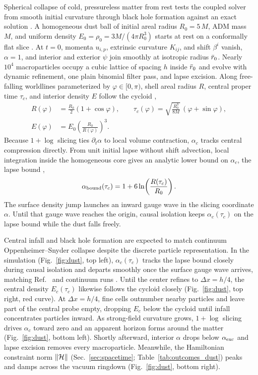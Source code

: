 Spherical collapse of cold, pressureless matter from rest tests the coupled solver from smooth initial curvature through black hole formation against an exact solution \cite{Oppenheimer:1939ue}. A homogeneous dust ball of initial areal radius $R_0 = 5\,M$, ADM mass $M$, and uniform density $E_0 = \rho_0 = 3M/(4\pi R_0^3)$ starts at rest on a conformally flat slice \cite{Petrich:1985jko,Staley:2011ss,Wu:2026nrpic}. At $t = 0$, momenta $u_{i,p}$, extrinsic curvature $K_{ij}$, and shift $\beta^i$ vanish, $\alpha = 1$, and interior and exterior $\psi$ join smoothly at isotropic radius $\bar{r}_0$. Nearly $10^4$ macroparticles occupy a cubic lattice of spacing $h$ inside $\bar{r}_0$ and evolve with dynamic refinement, one plain binomial filter pass, and lapse excision. Along free-falling worldlines parameterized by $\varphi \in [0, \pi)$, shell areal radius $R$, central proper time $\tau_c$, and interior density $E$ follow the cycloid \cite{Oppenheimer:1939ue},
\begin{align}\label{eq:cycloid}
R(\varphi) &= \frac{R_0}{2}(1 + \cos\varphi), \qquad
\tau_c(\varphi) = \sqrt{\frac{R_0^3}{8M}}\,(\varphi + \sin\varphi), \nonumber\\
E(\varphi) &= E_0\!\left(\frac{R_0}{R(\varphi)}\right)^3.
\end{align}
Because $1+\log$ slicing ties $\partial_t\alpha$ to local volume contraction, $\alpha_c$ tracks central compression directly. From unit initial lapse without shift advection, local integration inside the homogeneous core gives an analytic lower bound on $\alpha_c$, the lapse bound \cite{Staley:2011ss},
\begin{equation}\label{eq:lapse_bound}
\alpha_{\rm bound}(\tau_c) = 1 + 6\ln\!\left(\frac{R(\tau_c)}{R_0}\right).
\end{equation}
The surface density jump launches an inward gauge wave in the slicing coordinate $\alpha$. Until that gauge wave reaches the origin, causal isolation keeps $\alpha_c(\tau_c)$ on the lapse bound while the dust falls freely.

Central infall and black hole formation are expected to match continuum Oppenheimer--Snyder collapse despite the discrete particle representation. In the simulation (Fig.~\ref{fig:dust}, top left), $\alpha_c(\tau_c)$ tracks the lapse bound closely during causal isolation and departs smoothly once the surface gauge wave arrives, matching Ref.~\cite{Wu:2026nrpic} and continuum runs \cite{Staley:2011ss}. Until the center refines to $\Delta x = h/4$, the central density $E_c(\tau_c)$ likewise follows the cycloid closely (Fig.~\ref{fig:dust}, top right, red curve). At $\Delta x = h/4$, fine cells outnumber nearby particles and leave part of the central probe empty, dropping $E_c$ below the cycloid until infall concentrates particles inward. As strong-field curvature grows, $1+\log$ slicing drives $\alpha_c$ toward zero and an apparent horizon forms around the matter (Fig.~\ref{fig:dust}, bottom left). Shortly afterward, interior $\alpha$ drops below $\alpha_{\rm exc}$ and lapse excision removes every macroparticle. Meanwhile, the Hamiltonian constraint norm $\|\mathcal{H}\|$ (Sec.~\ref{sec:spacetime}; Table~\ref{tab:outcomes_dust}) peaks and damps across the vacuum ringdown (Fig.~\ref{fig:dust}, bottom right).

